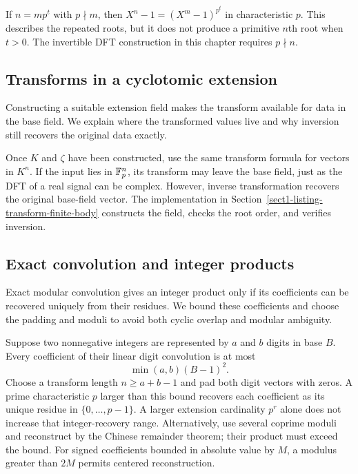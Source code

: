 \begin{rem}
\label{rmk-cyclotomy-cas-special}
If $n=mp^t$ with $p\nmid m$, then
$X^n-1=(X^m-1)^{p^t}$ in characteristic $p$. This describes the repeated
roots, but it does not produce a primitive $n$th root when $t>0$.
The invertible DFT construction in this chapter requires $p\nmid n$.
\end{rem}

\subsection{Transforms in a cyclotomic extension}
\label{sect2-trans-cyclotomic-field}

Constructing a suitable extension field makes the transform available for
data in the base field. We explain where the transformed values live and why
inversion still recovers the original data exactly.

Once $K$ and $\zeta$ have been constructed, use the same transform formula
for vectors in $K^n$. If the input lies in $\mathbb{F}_p^n$, its transform may
leave the base field, just as the DFT of a real signal can be complex.
However, inverse transformation recovers the original base-field vector.
The implementation in Section~\ref{sect1-listing-transform-finite-body}
constructs the field, checks the root order, and verifies inversion.

\subsection{Exact convolution and integer products}
\label{sect2-effective-calculations}

Exact modular convolution gives an integer product only if its coefficients
can be recovered uniquely from their residues. We bound these coefficients
and choose the padding and moduli to avoid both cyclic overlap and modular
ambiguity.

Suppose two nonnegative integers are represented by $a$ and $b$ digits
in base $B$. Every coefficient of their linear digit convolution is at most
\[
 \min(a,b)(B-1)^2.
\]
Choose a transform length $n\geq a+b-1$ and pad both digit vectors with
zeros. A prime characteristic $p$ larger than this bound recovers each
coefficient as its unique residue in $\{0,\ldots,p-1\}$. A larger extension
cardinality $p^r$ alone does not increase that integer-recovery range.
Alternatively, use several coprime moduli and reconstruct by the Chinese
remainder theorem; their product must exceed the bound. For signed
coefficients bounded in absolute value by $M$, a modulus greater than
$2M$ permits centered reconstruction.

